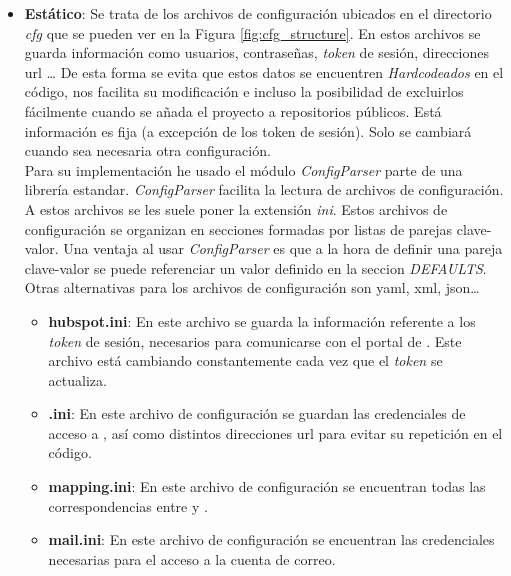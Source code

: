 \begin{itemize}[leftmargin=*]
\item \textbf{Estático}: Se trata de los archivos de configuración ubicados en el directorio \textit{cfg} que se pueden ver en la Figura \ref{fig:cfg_structure}.
En estos archivos se guarda información como usuarios, contraseñas, \textit{token} de sesión, direcciones url \ldots
De esta forma se evita que estos datos se encuentren \textit{Hardcodeados} en el código, nos facilita su modificación e
incluso la posibilidad de excluirlos fácilmente cuando se añada el proyecto a repositorios públicos.
Está información es fija (a excepción de los token de sesión). Solo se cambiará cuando sea necesaria otra configuración.\\

Para su implementación he usado el módulo \textit{ConfigParser} \cite{ConfigParser} parte de una librería estandar. \textit{ConfigParser} facilita la lectura de archivos de configuración. A estos archivos se les suele poner la extensión \textit{ini}.
Estos archivos de configuración se organizan en secciones formadas por listas de parejas clave-valor.
Una ventaja al usar \textit{ConfigParser} es que a la hora de definir una pareja clave-valor se puede referenciar un valor definido en la seccion \textit{DEFAULTS}.
Otras alternativas para los archivos de configuración son yaml, xml, json\ldots



\begin{itemize}
	\item [\textendash] \textbf{hubspot.ini}: En este archivo se guarda la información referente a los \textit{token} de sesión, necesarios para comunicarse con el portal de \hs. 
	Este archivo está cambiando constantemente cada vez que el \textit{token} se actualiza.
	\item [\textendash] \textbf{\wday.ini}: En este archivo de configuración se 
	guardan las credenciales de acceso a \wday{}, así como distintos direcciones url para evitar su repetición en el código.
	\item [\textendash] \textbf{mapping.ini}: En este archivo de configuración se encuentran todas las correspondencias entre \hs{} y \wday.
	\item [\textendash] \textbf{mail.ini}: En este archivo de configuración se encuentran las credenciales necesarias para el acceso a la cuenta de correo.
\end{itemize}





\end{itemize}
